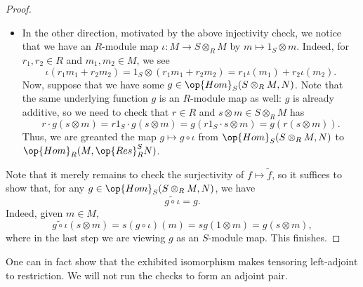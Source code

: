 \begin{proof}
\begin{itemize}
		\item In the other direction, motivated by the above injectivity check, we notice that we have an $R$-module map $\iota:M\to S\otimes_RM$ by $m\mapsto 1_S\otimes m$. Indeed, for $r_1,r_2\in R$ and $m_1,m_2\in M$, we see
		\[\iota(r_1m_1+r_2m_2)=1_S\otimes(r_1m_1+r_2m_2)=r_1\iota(m_1)+r_2\iota(m_2).\]
		Now, suppose that we have some $g\in\op{Hom}_S(S\otimes_RM,N)$. Note that the same underlying function $g$ is an $R$-module map as well: $g$ is already additive, so we need to check that $r\in R$ and $s\otimes m\in S\otimes_RM$ has
		\[r\cdot g(s\otimes m)=r1_S\cdot g(s\otimes m)=g(r1_S\cdot s\otimes m)=g(r(s\otimes m)).\]
		Thus, we are greanted the map $g\mapsto g\circ\iota$ from $\op{Hom}_S(S\otimes_RM,N)$ to $\op{Hom}_R(M,\op{Res}_R^SN)$.
	\end{itemize}
	Note that it merely remains to check the surjectivity of $f\mapsto\widetilde f$, so it suffices to show that, for any $g\in\op{Hom}_S(S\otimes_RM,N)$, we have
	\[\widetilde{g\circ\iota}=g.\]
	Indeed, given $m\in M$,
	\[\widetilde{g\circ\iota}(s\otimes m)=s(g\circ\iota)(m)=sg(1\otimes m)=g(s\otimes m),\]
	where in the last step we are viewing $g$ as an $S$-module map. This finishes.
\end{proof}
\begin{remark}
	One can in fact show that the exhibited isomorphism makes tensoring left-adjoint to restriction. We will not run the checks to form an adjoint pair.
\end{remark}

